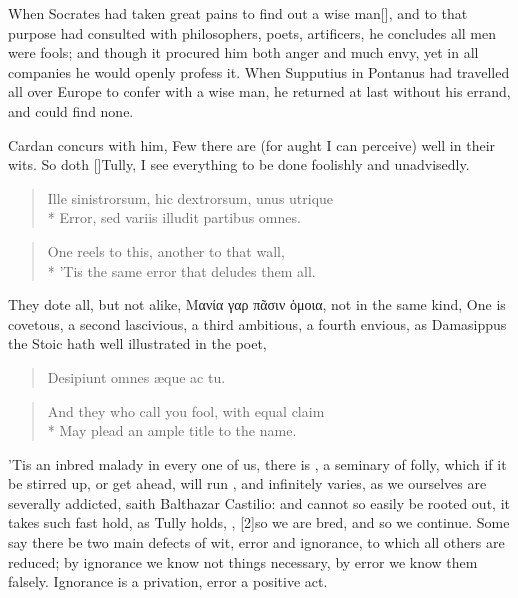 {When Socrates had taken great pains to find out a wise man[\baselineskip], and to
that purpose had consulted with philosophers, poets, artificers, he
concludes all men were fools; and though it procured him both anger and
much envy, yet in all companies he would openly profess it. When 
Supputius in Pontanus had travelled all over Europe to confer with a
wise man, he returned at last without his errand, and could find none.

 Cardan concurs with him, Few there are (for aught I can perceive)
well in their wits. So doth [\baselineskip]Tully, I see everything to be done
foolishly and unadvisedly.
%
\begin{latin}
\begin{verse}
Ille sinistrorsum, hic dextrorsum, unus utrique\\*
Error, sed variis illudit partibus omnes.
\end{verse}
\end{latin}
\translationrule%
\begin{verse}
One reels to this, another to that wall,\\*
'Tis the same error that deludes them all.
\end{verse}

They dote all, but not alike, \textgreek{Μανία γαρ πᾶσιν ὁμοια}, not in the
same kind, One is covetous, a second lascivious, a third ambitious, a
fourth envious, \etc as Damasippus the Stoic hath well illustrated in
the poet,
%
\begin{latin}
\begin{verse}
Desipiunt omnes \ae{}que ac tu.
\end{verse}
\end{latin}
\translationrule
\begin{verse}
And they who call you fool, with equal claim\\*
May plead an ample title to the name.
\end{verse}
%

'Tis an inbred malady in every one of us, there is , a seminary of folly, which if it be stirred up, or get
ahead, will run , and infinitely varies, as we ourselves
are severally addicted, saith Balthazar Castilio: and cannot so
easily be rooted out, it takes such fast hold, as Tully holds, , [2\baselineskip]so we are bred, and so we continue. Some say
there be two main defects of wit, error and ignorance, to which all
others are reduced; by ignorance we know not things necessary, by error
we know them falsely. Ignorance is a privation, error a positive act.

}
